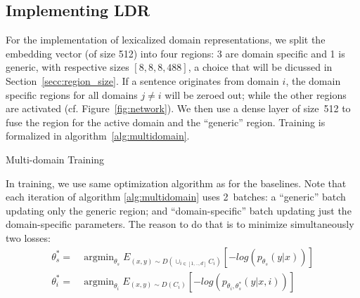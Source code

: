 \documentclass[11pt,a4paper]{article}
\DeclareMathOperator*{\argmin}{argmin}
\newcommand{\fyTodo}[1]{\Todo[FY:]{\textcolor{orange}{#1}}}
\begin{document}
\subsection{Implementing LDR}\fyTodo{Check acronym.}
\fyTodo{Motivate the split - discuss experimentally embedding size}
For the implementation of lexicalized domain representations, we split the embedding vector (of size 512) into four regions: 3 are domain specific and 1 is generic, with respective sizes $[8,8,8,488]$, a choice that will be dicussed in Section~\ref{secc:region_size}. If a sentence originates from domain $i$, the domain specific regions for all domains $j \neq i$ will be zeroed out; while the other regions are activated (cf. Figure~\ref{fig:network}). We then use a dense layer of size~512 to fuse the region for the active domain and the ``generic'' region. Training is formalized in algorithm~\ref{alg:multidomain}.\fyTodo{Notation B for batch size}

\begin{algorithm}[h]
\caption{Multi-domain Training}
\label{alg:multidomain}
\begin{algorithmic}[1]
\REPEAT 
{}
\end{algorithmic}
\end{algorithm}

In training, we use same optimization algorithm as for the baselines. Note that each iteration of algorithm \ref{alg:multidomain} uses 2~batches: a ``generic'' batch updating only the generic region; and ``domain-specific'' batch updating just the domain-specific parameters. The reason to do that is to minimize simultaneously two losses:
\begin{align*}
\theta^*_{s}=&\displaystyle{\mathop{\argmin}_{\theta_s}}E_{(x,y) \sim D(\displaystyle{\mathop{\cup}_{i \in [1,..,d]}}C_{i})}[-log(p_{\theta_s}(y|x))] \\ 
 \theta^*_{i}=&\displaystyle{\mathop{\argmin}_{\theta_i}}E_{(x,y) \sim D(C_{i})}[-log(p_{\theta_i,\theta^*_s}(y|x,i))]
\end{align*} 
\end{document}

